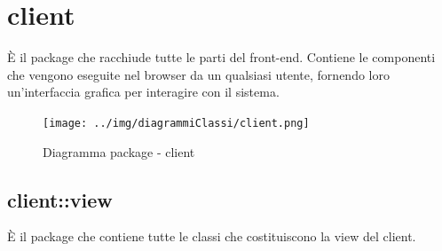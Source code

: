 \section{client}
È il package che racchiude tutte le parti del front-end. Contiene le componenti che vengono eseguite nel browser da un qualsiasi utente, fornendo loro un’interfaccia grafica per interagire con il sistema.\begin{center}
		\begin{figure}[H]
			\centering \texttt{[image: ../img/diagrammiClassi/client.png]}
			\caption{Diagramma package - client}
		\end{figure}
	\end{center}\subsection{client::view}
È il package che contiene tutte le classi che costituiscono la view del client. 
